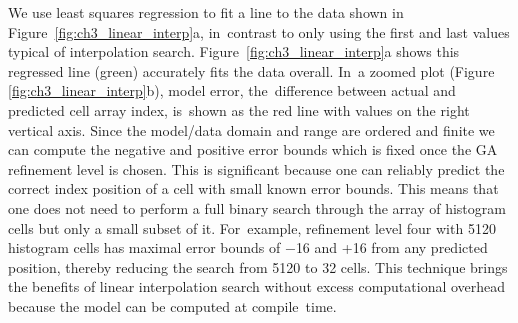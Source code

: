We use least squares regression to fit a line to the data shown in Figure~\ref{fig:ch3_linear_interp}a, in~contrast to only using the first and last values typical of interpolation search. Figure~\ref{fig:ch3_linear_interp}a shows this regressed line (green) accurately fits the data overall. In~a zoomed plot (Figure \ref{fig:ch3_linear_interp}b), model error, the~difference between actual and predicted cell array index, is~shown as the red line with values on the right vertical axis. Since the model/data domain and range are ordered and finite we can compute the negative and positive error bounds which is fixed once the GA refinement level is chosen. This is significant because one can reliably predict the correct index position of a cell with small known error bounds. This means that one does not need to perform a full binary search through the array of histogram cells but only a small subset of it. For~example, refinement level four with 5120 histogram cells has maximal error bounds of $-$16 and +16 from any predicted position, thereby reducing the search from 5120 to 32 cells. This technique brings the benefits of linear interpolation search without excess computational overhead because the model can be computed at compile~time.
\vspace{-6pt}
